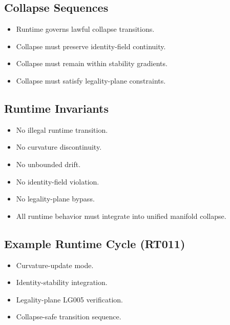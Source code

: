 \subsection{Collapse Sequences}
\begin{itemize}
    \item Runtime governs lawful collapse transitions.
    \item Collapse must preserve identity-field continuity.
    \item Collapse must remain within stability gradients.
    \item Collapse must satisfy legality-plane constraints.
\end{itemize}

\subsection{Runtime Invariants}
\begin{itemize}
    \item No illegal runtime transition.
    \item No curvature discontinuity.
    \item No unbounded drift.
    \item No identity-field violation.
    \item No legality-plane bypass.
    \item All runtime behavior must integrate into unified manifold collapse.
\end{itemize}

\subsection{Example Runtime Cycle (RT011)}
\begin{itemize}
    \item Curvature-update mode.
    \item Identity-stability integration.
    \item Legality-plane LG005 verification.
    \item Collapse-safe transition sequence.
\end{itemize}

